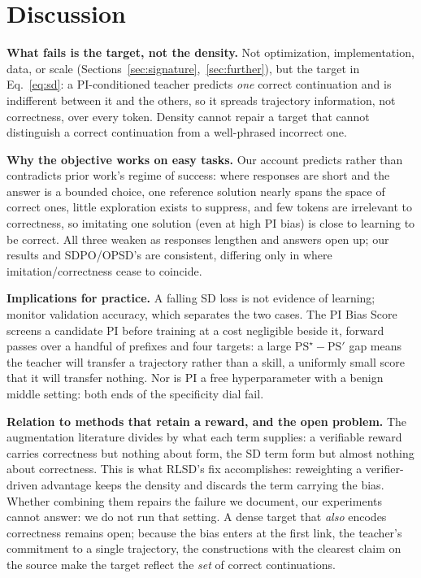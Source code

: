 \documentclass{article}
\newcommand{\pibias}{\mathrm{PS}}            %
\begin{document}
\section{Discussion}
\label{sec:discussion}

\textbf{What fails is the target, not the density.} Not optimization, implementation, data, or scale (Sections~\ref{sec:signature},~\ref{sec:further}), but the target in Eq.~\eqref{eq:sd}: a PI-conditioned teacher predicts \textit{one} correct continuation and is indifferent between it and the others, so it spreads trajectory information, not correctness, over every token. Density cannot repair a target that cannot distinguish a correct continuation from a well-phrased incorrect one.

\textbf{Why the objective works on easy tasks.} Our account predicts rather than contradicts
prior work's regime of success: where responses are short and the answer is a bounded choice,
one reference solution nearly spans the space of correct ones, little exploration exists to
suppress, and few tokens are irrelevant to correctness, so imitating one solution (even at
high PI bias) is close to learning to be correct. All three weaken as responses lengthen and
answers open up; our results and SDPO/OPSD's are consistent,
differing only in where imitation/correctness cease to coincide.

\textbf{Implications for practice.} A falling SD loss is not evidence of
learning; monitor validation accuracy, which separates the two cases. The PI Bias Score
screens a candidate PI before training at a cost negligible beside it, forward passes over a
handful of prefixes and four targets: a large $\pibias^{\star}-\pibias'$ gap means the teacher
will transfer a trajectory rather than a skill, a uniformly small score that it will transfer
nothing. Nor is PI a free hyperparameter with a benign middle setting: both ends of the
specificity dial fail.

\textbf{Relation to methods that retain a reward, and the open problem.} The augmentation
literature \citep{rlsd2025,skillsd2025,sdar2025} divides by what each term supplies: a
verifiable reward carries correctness but nothing about form, the SD term form but almost
nothing about correctness. This is what RLSD's fix accomplishes: reweighting a verifier-driven
advantage keeps the density and discards the term carrying the bias. Whether combining them
repairs the failure we document, our experiments cannot answer: we do not run that setting. A
dense target that \textit{also} encodes correctness remains open; because the bias enters at
the first link, the teacher's commitment to a single trajectory, the constructions with the
clearest claim on the source make the target reflect the \textit{set} of correct continuations.
\end{document}
